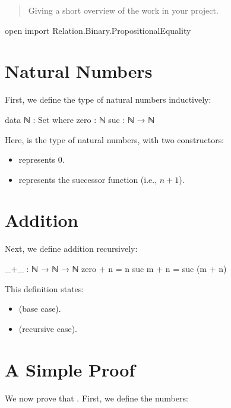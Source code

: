 

\begin{abstract}

Giving a short overview of the work in your project.\cite{ABBOTT20053}

\end{abstract}

\begin{code}
open import Relation.Binary.PropositionalEquality  
\end{code}

\section{Natural Numbers}
First, we define the type of natural numbers inductively:

\begin{code}
data ℕ : Set where
  zero : ℕ
  suc  : ℕ → ℕ
\end{code}

Here,  is the type of natural numbers, with two constructors:
\begin{itemize}
  \item {} represents 0.
  \item {} represents the successor function (i.e., $n+1$).
\end{itemize}

\section{Addition}
Next, we define addition recursively:

\begin{code}
_+_ : ℕ → ℕ → ℕ
zero  + n = n
suc m + n = suc (m + n)
\end{code}

This definition states:
\begin{itemize}
  \item {} (base case).
  \item {} (recursive case).
\end{itemize}

\section{A Simple Proof}
We now prove that . First, we define the numbers:

